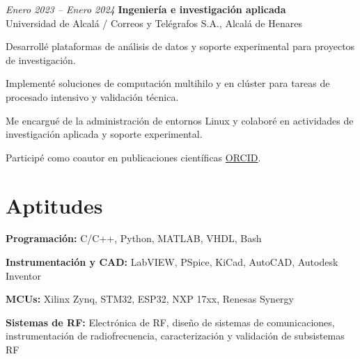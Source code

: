 \begin{twocolentry}{\textit{Enero 2023 – Enero 2024}}
	\textbf{Ingeniería e investigación aplicada} \\
	Universidad de Alcalá / Correos y Telégrafos S.A., Alcalá de Henares
\end{twocolentry}
\begin{onecolentry}
	\begin{highlights}
		\item Desarrollé plataformas de análisis de datos y soporte experimental para proyectos de investigación.
		\item Implementé soluciones de computación multihilo y en clúster para tareas de procesado intensivo y validación técnica.
		\item Me encargué de la administración de entornos Linux y colaboré en actividades de investigación aplicada y soporte experimental.
		\item Participé como coautor en publicaciones científicas \href{https://orcid.org/0009-0000-6862-1872}{ORCID}.
	\end{highlights}
\end{onecolentry}

\vspace{-10pt}

\section{Aptitudes}

\begin{onecolentry}
	\textbf{Programación:} C/C++, Python, MATLAB, VHDL, Bash
\end{onecolentry}
\begin{onecolentry}
	\textbf{Instrumentación y CAD:} LabVIEW, PSpice, KiCad, AutoCAD, Autodesk Inventor
\end{onecolentry}
\begin{onecolentry}
	\textbf{MCUs:} Xilinx Zynq, STM32, ESP32, NXP 17xx, Renesas Synergy
\end{onecolentry}
\begin{onecolentry}
	\textbf{Sistemas de RF:} Electrónica de RF, diseño de sistemas de comunicaciones, instrumentación de radiofrecuencia, caracterización y validación de subsistemas RF
\end{onecolentry}